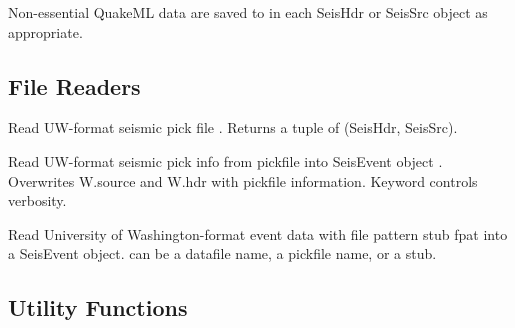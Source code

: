 \documentclass[letterpaper,11pt,english]{sphinxmanual}
\begin{document}
Non-essential QuakeML data are saved to  in each SeisHdr or SeisSrc object
as appropriate.


\subsection{File Readers}
\label{\detokenize{src/Submodules/quake:file-readers}}

\begin{fulllineitems}
\label{\detokenize{src/Submodules/quake:uwpf}}
\end{fulllineitems}


Read UW-format seismic pick file . Returns a tuple of (SeisHdr, SeisSrc).


\begin{fulllineitems}
\end{fulllineitems}


Read UW-format seismic pick info from pickfile  into SeisEvent object .
Overwrites W.source and W.hdr with pickfile information. Keyword  controls
verbosity.

\begin{fulllineitems}
\label{\detokenize{src/Submodules/quake:readuwevt}}
Read University of Washington-format event data with file pattern stub fpat
into a SeisEvent object.  can be a datafile name, a pickfile name, or
a stub.

\end{fulllineitems}



\subsection{Utility Functions}
\label{\detokenize{src/Submodules/quake:utility-functions}}

\begin{fulllineitems}
\end{fulllineitems}
\end{document}
